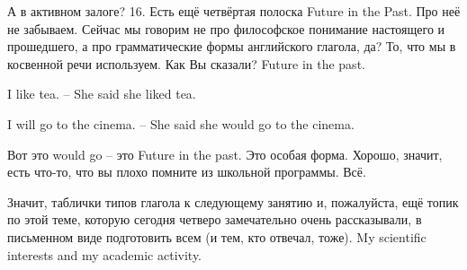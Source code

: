 \documentclass[main.tex]{subfiles}
\begin{document}
А в активном залоге? 16.
Есть ещё четвёртая полоска Future in the Past.
Про неё не забываем.
Сейчас мы говорим не про философское понимание настоящего и прошедшего, а про грамматические формы английского глагола, да?
То, что мы в косвенной речи используем.
Как Вы сказали?
Future in the past.

I like tea. -- She said she liked tea.

I will go to the cinema. -- She said she would go to the cinema.

Вот это would go -- это Future in the past.
Это особая форма.
Хорошо, значит, есть что-то, что вы плохо помните из школьной программы.
Всё.

Значит, таблички типов глагола к следующему занятию и, пожалуйста, ещё топик по этой теме, которую сегодня четверо замечательно очень рассказывали, в письменном виде подготовить всем (и тем, кто отвечал, тоже).
My scientific interests and my academic activity.
\end{document}
